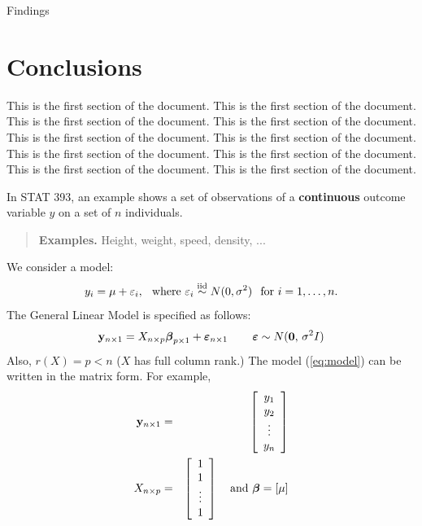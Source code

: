 \documentclass[12pt]{article}
\newcommand{\ubeta}{\mbox{\boldmath$\beta$}}
\begin{document}
\label{s.key}


Findings

\section{Conclusions}

\label{s.conclusions}



This is the first section of the document. This is the first section of the document. This is the first section of the document.  This is the first section of the document. This is the first section of the document. This is the first section of the document. This is the first section of the document. This is the first section of the document. This is the first section of the document. This is the first section of the document.

In STAT 393, an example shows a set of observations of a {\bf continuous} outcome
variable $y$ on a set of $n$ individuals.
\begin{quote}
{\bf Examples.}  Height, weight, speed, density, ...
\end{quote}
We consider a model:
\begin{equation}
\label{eq:model}
   y_i =\mu + \varepsilon_i, \hspace{.1in} \mbox{where }
   \varepsilon_i \overset{\text{iid}}{\sim} N(0,\sigma^2)\hspace{.1in}
       \text{for } i=1,\ldots,n.
\end{equation}
The General Linear Model is specified as follows:
\[
  {\bf y}_{n\times 1}=
  {X}_{n\times p}\ubeta_{p\times 1}+\bm{\varepsilon}_{n\times 1}
  \hspace{.3in} \bm{\varepsilon}\sim N({\bf 0},\,\sigma^2{I})
\]
Also, $r({X})=p<n$ (${X}$ has full column rank.)  The model (\ref{eq:model}) can be written in the matrix form.  For example,
\begin{eqnarray*}
{\bf y}_{n\times 1} &=&  \left[\begin{array}{c}y_1\\ y_2\\ \vdots\\ y_n\end{array}\right]\\
X_{n\times p}&=&
 \left[\begin{array}{c}1\\ 1\\ \vdots\\ 1\end{array}\right]
\hspace{.1in} \mbox{ and }
\ubeta=\left[ \mu \right ]
\end{eqnarray*}
\end{document}
